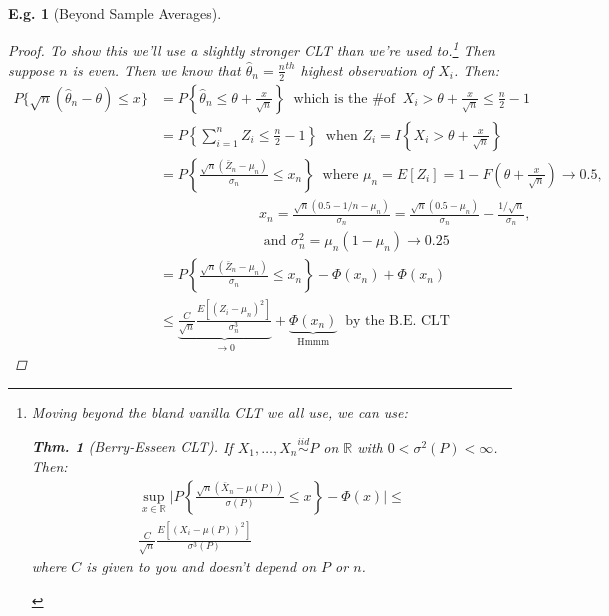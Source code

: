 \documentclass{tufte-book}
\theoremstyle{mytheoremstyle}
\newtheorem*{thm}{Thm.}
\theoremstyle{mylemstyle}
\theoremstyle{mydefstyle}
\newtheorem*{ex}{E.g.}
\begin{document}
\begin{ex}[Beyond Sample Averages]
\begin{proof}
To show this we'll use a slightly stronger CLT than we're used to.\footnote[][-2in]{Moving beyond the bland vanilla CLT we all use, we can use:\begin{thm}[Berry-Esseen CLT] If \(X_1, \dots, X_n \overset{iid}{\sim} P\) on \(\mathbb{R}\) with \(0 < \sigma^2(P) < \infty\). Then:
	\begin{align*}
		\sup_{x \in \mathbb{R}} \Bigg| P\left\{ \frac{\sqrt{n}(\bar{X}_n - \mu(P))}{\sigma(P)} \le x \right\} - \Phi(x) \Bigg| \le \\
		\frac{C}{\sqrt{n}}\frac{E[(X_i - \mu(P))^2]}{\sigma^3(P)}
	\end{align*}
where \(C\) is given to you and doesn't depend on \(P\) or \(n\).\end{thm} } Then suppose \(n\) is even. Then we know that \(\hat{\theta}_n = \frac{n}{2}^{th}\) highest observation of \(X_i\). Then:
	\begin{align*}
		P\{\sqrt{n} (\hat{\theta}_n - \theta) \le x\} & = P\left\{\hat{\theta}_n \le \theta + \frac{x}{\sqrt{n}}\right\}\ \text{ which is the \# of }\ X_i > \theta + \frac{x}{\sqrt{n}} \le \frac{n}{2} - 1 \\
									& = P\left\{\sum_{i = 1}^n Z_i \le \frac{n}{2} - 1\right\}\ \text{ when } Z_i = I\left\{X_i > \theta + \frac{x}{\sqrt{n}}\right\} \\
									& = P\left\{\frac{\sqrt{n}(\bar{Z}_n - \mu_n)}{\sigma_n} \le x_n\right\}\ \text{ where } \mu_n = E[Z_i] = 1 - F\left(\theta + \frac{x}{\sqrt{n}}\right) \rightarrow 0.5 \text{,} \\
									& \hspace{3cm} x_n = \frac{\sqrt{n}(0.5 - 1/n - \mu_n)}{\sigma_n} = \frac{\sqrt{n}(0.5 - \mu_n)}{\sigma_n} - \frac{1/\sqrt{n}}{\sigma_n} \text{,} \\
									& \hspace{3cm} \text{ and } \sigma^2_n = \mu_n (1- \mu_n) \rightarrow 0.25 \\
									&= P\left\{\frac{\sqrt{n}(\bar{Z}_n - \mu_n)}{\sigma_n} \le x_n\right\} - \Phi(x_n) + \Phi(x_n) \\
									& \le \underbrace{\frac{C}{\sqrt{n}}\frac{E[(Z_i - \mu_n)^2]}{\sigma_n^3}}_\textrm{\(\rightarrow 0\)} + \underbrace{\Phi(x_n)}_\textrm{Hmmm}\ \text{ by the B.E. CLT } 
	\end{align*}

\end{proof}
\end{ex}
\end{document}
